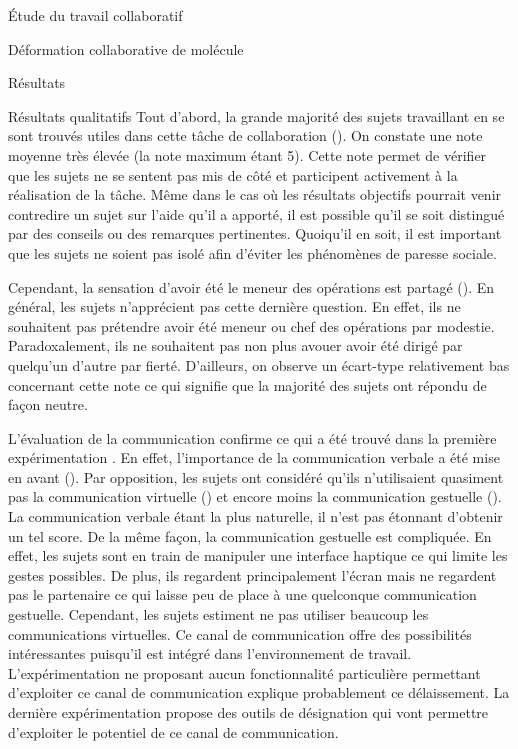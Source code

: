 \documentclass[myfrancais]{mythesis}
\begin{document}
\begin{mypart}{Étude du travail collaboratif}
\begin{mychapter}{Déformation collaborative de molécule}
\begin{mysection}{Résultats}
\begin{mysubsection}{Résultats qualitatifs}
					Tout d'abord, la grande majorité des sujets travaillant en  se sont trouvés utiles dans cette tâche de collaboration ().
					On constate une note moyenne très élevée (la note maximum étant 5).
					Cette note permet de vérifier que les sujets ne se sentent pas mis de côté et participent activement à la réalisation de la tâche.
					Même dans le cas où les résultats objectifs pourrait venir contredire un sujet sur l'aide qu'il a apporté, il est possible qu'il se soit distingué par des conseils ou des remarques pertinentes.
					Quoiqu'il en soit, il est important que les sujets ne soient pas isolé afin d'éviter les phénomènes de paresse sociale.

					Cependant, la sensation d'avoir été le meneur des opérations est partagé ().
					En général, les sujets n'apprécient pas cette dernière question.
					En effet, ils ne souhaitent pas prétendre avoir été meneur ou chef des opérations par modestie.
					Paradoxalement, ils ne souhaitent pas non plus avouer avoir été dirigé par quelqu'un d'autre par fierté.
					D'ailleurs, on observe un écart-type relativement bas concernant cette note ce qui signifie que la majorité des sujets ont répondu de façon neutre.

					L'évaluation de la communication confirme ce qui a été trouvé dans la première expérimentation .
					En effet, l'importance de la communication verbale a été mise en avant ().
					Par opposition, les sujets ont considéré qu'ils n'utilisaient quasiment pas la communication virtuelle () et encore moins la communication gestuelle ().
					La communication verbale étant la plus naturelle, il n'est pas étonnant d'obtenir un tel score.
					De la même façon, la communication gestuelle est compliquée.
					En effet, les sujets sont en train de manipuler une interface haptique ce qui limite les gestes possibles.
					De plus, ils regardent principalement l'écran mais ne regardent pas le partenaire ce qui laisse peu de place à une quelconque communication gestuelle.
					Cependant, les sujets estiment ne pas utiliser beaucoup les communications virtuelles.
					Ce canal de communication offre des possibilités intéressantes puisqu'il est intégré dans l'environnement de travail.
					L'expérimentation ne proposant aucun fonctionnalité particulière permettant d'exploiter ce canal de communication explique probablement ce délaissement.
					La dernière expérimentation  propose des outils de désignation qui vont permettre d'exploiter le potentiel de ce canal de communication.


\end{mysubsection}
\end{mysection}
\end{mychapter}
\end{mypart}
\end{document}
